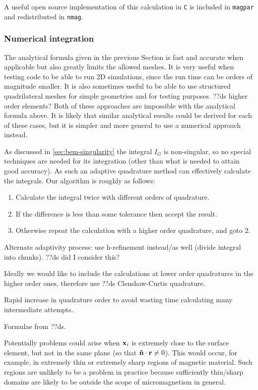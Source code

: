 A useful open source implementation of this calculation in \texttt{C} is included in \texttt{magpar}\cite{magpar-website} and redistributed in \texttt{nmag}\cite{nmag-website}.


\subsubsection{Numerical integration}

The analytical formula given in the previous Section is fast and accurate when applicable but also greatly limits the allowed meshes.
It is very useful when testing code to be able to run 2D simulations, since the run time can be orders of magnitude smaller.
It is also sometimes useful to be able to use structured quadrilateral meshes for simple geometries and for testing purposes.
??ds higher order elements?
Both of these approaches are impossible with the analytical formula above.
It is likely that similar analytical results could be derived for each of these cases, but it is simpler and more general to use a numerical approach instead.

As discussed in \autoref{sec:bem-singularity} the integral $I_G$ is non-singular, so no special techniques are needed for its integration (other than what is needed to attain good accuracy).
As such an adaptive quadrature method can effectively calculate the integrals.
Our algorithm is roughly as follows:
\begin{enumerate}
\item Calculate the integral twice with different orders of quadrature.
\item If the difference is less than some tolerance then accept the result.
\item Otherwise repeat the calculation with a higher order quadrature, and goto 2.
\end{enumerate}

Alternate adaptivity process: use h-refinement instead/as well (divide integral into chunks). ??ds did I consider this?

Ideally we would like to include the calculations at lower order quadratures in the higher order ones, therefore use ??ds Clenshaw-Curtis quadrature\cite{Trefethen2008}.

Rapid increase in quadrature order to avoid wasting time calculating many intermediate attempts.

Formulae from ??ds.

Potentially problems could arise when $\mathbf{x}_i$ is extremely close to the surface element, but not in the same plane (so that $\mathbf{\hat{n}} \cdot \mathbf{r} \neq 0$).
This would occur, for example, in extremely thin or extremely sharp regions of magnetic material.
Such regions are unlikely to be a problem in practice because sufficiently thin/sharp domains are likely to be outside the scope of micromagnetism in general.



